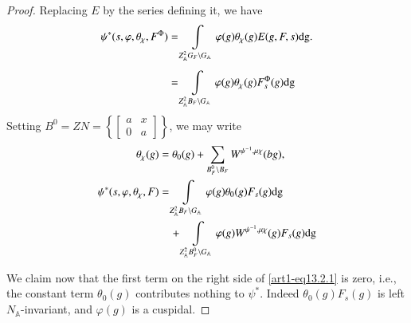 \begin{proof}
Replacing $E$ by the series defining it, we have
\begin{align*}
\psi^{*}(s,\varphi,\theta_{\chi},F^{\Phi}) &= \int\limits_{Z^{2}_{\mathbb{A}}G_{F}\backslash G_{\mathbb{A}}}\varphi(g)\theta_{\chi}(g)E(g,F,s)\mathrm{dg}.\\[4pt]
&=\int\limits_{Z^{2}_{\mathbb{A}}B_{F}\backslash G_{\mathbb{A}}}\varphi(g)\theta_{\chi}(g)F^{\Phi}_{s}(g)\mathrm{dg}
\end{align*}
Setting $B^{0}=ZN=\left\{\left[\begin{smallmatrix} a & x\\ 0 & a\end{smallmatrix}\right]\right\}$, we may write
\setcounter{subsection}{2}
\setcounter{equation}{0}
\begin{align}
\theta_{\chi}(g) &=\theta_{0}(g)+\sum\limits_{B^{0}_{F}\backslash B_{F}}W^{\psi^{-1},\mu\chi}(bg),\notag\\
\psi^{*}(s,\varphi,\theta_{\chi},F) &= \int\limits_{Z^{2}_{\mathbb{A}}B_{F}\backslash G_{\mathbb{A}}}\varphi(g)\theta_{0}(g)F_{s}(g)\mathrm{dg}\notag\\
&\quad + \int\limits_{Z^{2}_{\mathbb{A}}B^{0}_{F}\backslash G_{\mathbb{A}}}\varphi(g)W^{\psi^{-1},\mu\chi}(g)F_{s}(g)\mathrm{dg}\label{art1-eq13.2.1}
\end{align}\pageoriginale

We claim now that the first term on the right side of \eqref{art1-eq13.2.1} is zero, i.e., the constant term $\theta_{0}(g)$ contributes nothing to $\psi^{*}$. Indeed $\theta_{0}(g)F_{s}(g)$ is left $N_{\mathbb{A}}$-invariant, and $\varphi(g)$ is a cuspidal.


\end{proof}
